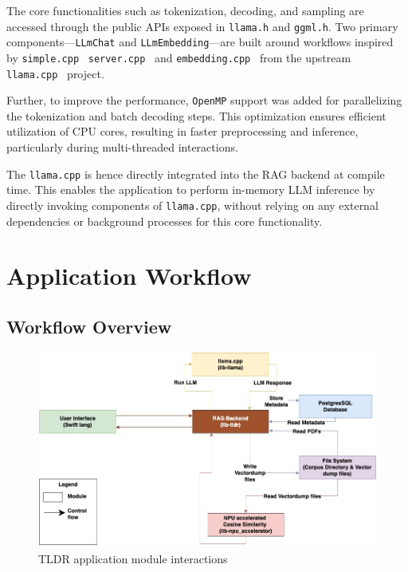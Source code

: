 The core functionalities such as tokenization, decoding, and sampling are accessed through the public APIs exposed in \texttt{llama.h} and \texttt{ggml.h}. Two primary components—\texttt{LLmChat} and \texttt{LLmEmbedding}—are built around workflows inspired by \texttt{simple.cpp}~\cite{llama_simple} \texttt{server.cpp}~\cite{llama_server} and \texttt{embedding.cpp}~\cite{llama_embedding} from the upstream \texttt{llama.cpp}~\cite{llamacpp} project. 

Further, to improve the performance, \texttt{OpenMP} support was added for parallelizing the tokenization and batch decoding steps. This optimization ensures efficient utilization of CPU cores, resulting in faster preprocessing and inference, particularly during multi-threaded interactions.

The \texttt{llama.cpp} is hence directly integrated into the RAG backend at compile time. This enables the application to perform in-memory LLM inference by directly invoking components of \texttt{llama.cpp}, without relying on any external dependencies or background processes for this core functionality.
\section{Application Workflow}
\label{sec:AppWorkflow}

\subsection{Workflow Overview}
\label{subsec:AppDesignWorkflow-Overview}

\begin{figure}[H]
    \centering
    \includegraphics[width=1.0\linewidth]{images/tldr-app-module-interactions.jpg}
    \caption{TLDR application module interactions}
    \label{fig:tldrmodulesinteraction}
\end{figure}

